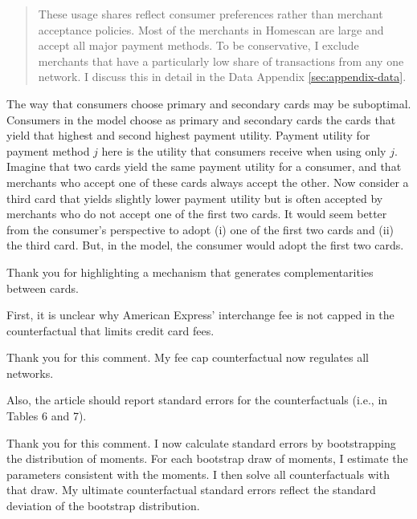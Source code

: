 \documentclass[main.tex]{subfiles}
\begin{document}
\begin{refsection}
\begin{quotation}
    These usage shares reflect consumer preferences rather than merchant acceptance policies.
Most of the merchants in Homescan are large and accept all major payment methods.
To be conservative, I exclude merchants that have a particularly low share of transactions from any one network.
I discuss this in detail in the Data Appendix \ref{sec:appendix-data}.
\end{quotation}

\begin{refcommentnoclear}
The way that consumers choose primary and secondary cards may be suboptimal.
Consumers in the model choose as primary and secondary cards the cards that yield that highest and second highest payment utility.
Payment utility for payment method \(j\) here is the utility that consumers receive when using only \(j\).
Imagine that two cards yield the same payment utility for a consumer, and that merchants who accept one of these cards always accept the other.
Now consider a third card that yields slightly lower payment utility but is often accepted by merchants who do not accept one of the first two cards.
It would seem better from the consumer's perspective to adopt (i) one of the first two cards and (ii) the third card.
But, in the model, the consumer would adopt the first two cards.
\end{refcommentnoclear}

Thank you for highlighting a mechanism that generates complementarities between cards.
\replycomplement

\begin{refcomment}
First, it is unclear why American Express' interchange fee is not capped in the counterfactual that limits credit card fees. 
\end{refcomment}

Thank you for this comment.
My fee cap counterfactual now regulates all networks.

\begin{refcommentnoclear}
Also, the article should report standard errors for the counterfactuals (i.e., in Tables 6 and 7). 
\end{refcommentnoclear}

Thank you for this comment.
I now calculate standard errors by bootstrapping the distribution of moments.
For each bootstrap draw of moments, I estimate the parameters consistent with the moments.
I then solve all counterfactuals with that draw.
My ultimate counterfactual standard errors reflect the standard deviation of the bootstrap distribution.


\end{refsection}
\end{document}
